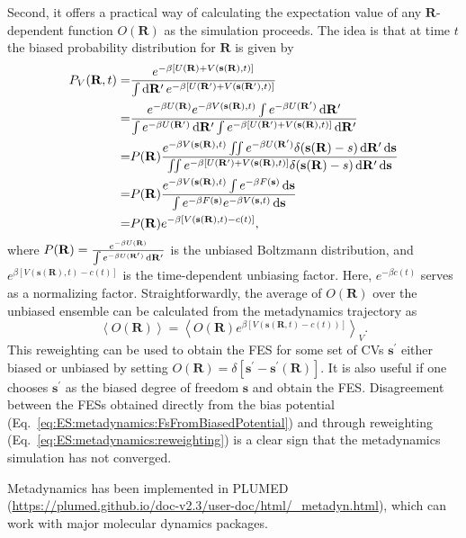 Second, it offers a practical way of calculating the expectation value of any $\mathbf{R}$-dependent function $O(\mathbf{R})$ as the simulation proceeds. The idea is that at time $t$ the biased probability distribution for $\mathbf{R}$ is given by
\begin{align}
    P_V{(\mathbf{R},t)}=&\frac{e^{-\beta\left[U(\mathbf{R})+V(\mathbf{s}(\mathbf{R}),t)\right]}}{\int \diff \mathbf{R}^\prime\, e^{-\beta\left[U(\mathbf{R}^\prime)+V(\mathbf{s}(\mathbf{R}^\prime),t)\right]}}\notag\\
                       =&\frac{e^{-\beta U(\mathbf{R})}e^{-\beta V(\mathbf{s}(\mathbf{R}),t)}\int e^{-\beta U(\mathbf{R^\prime})}\diff \mathbf{R}^\prime}{\int e^{-\beta U(\mathbf{R^\prime})}\diff \mathbf{R}^\prime \int e^{-\beta \left[U(\mathbf{R}^\prime)+V(\mathbf{s}(\mathbf{R}),t)\right]}\diff \mathbf{R}^\prime}\notag\\
                       =&P(\mathbf{R})\frac{e^{-\beta V(\mathbf{s}(\mathbf{R}),t)}\iint e^{-\beta U(\mathbf{R^\prime})}\delta (\mathbf{s}(\mathbf{R})-s)\diff \mathbf{R}^\prime \diff \mathbf{s}}{\iint e^{-\beta \left[U(\mathbf{R}^\prime)+V(\mathbf{s}(\mathbf{R}),t)\right]}\delta (\mathbf{s}(\mathbf{R})-s)\diff \mathbf{R}^\prime \diff \mathbf{s}}\notag\\
                       =&P(\mathbf{R})\frac{e^{-\beta V(\mathbf{s}(\mathbf{R}),t)}\int e^{-\beta F(\mathbf{s})}\diff \mathbf{s}}{\int e^{-\beta F(\mathbf{s})}e^{-\beta V(\mathbf{s},t)}\diff \mathbf{s}}\notag\\
                       =&P{(\mathbf{R})}e^{-\beta\left[V(\mathbf{s}(\mathbf{R}),t)-c(t)\right]},
\end{align}
where $P{(\mathbf{R})}=\frac{e^{-\beta U(\mathbf{R})}}{\int e^{-\beta U(\mathbf{R}^\prime)}\mathop{}\!\mathrm{d} \mathbf{R}^\prime}$ is the unbiased Boltzmann distribution, and $e^{\beta\left[V(\mathbf{s}(\mathbf{R}),t)-c(t)\right]}$ is the time-dependent unbiasing factor. Here, $e^{-\beta c(t)}$ serves as a normalizing factor. Straightforwardly, the average of $O(\mathbf{R})$ over the unbiased ensemble can be calculated from the metadynamics trajectory as
\begin{equation}
    \left<O(\mathbf{R})\right>=\left<O(\mathbf{R})e^{\beta\left[V(\mathbf{s}(\mathbf{R},t)-c(t))\right]}\right>_V.
    \label{eq:ES:metadynamics:reweighting}
\end{equation}
This reweighting can be used to obtain the FES for some set of CVs $\mathbf{s}^\prime$ either biased or unbiased by setting $O(\mathbf{R})=\delta[\mathbf{s}^\prime-\mathbf{s}^\prime(\mathbf{R})]$. It is also useful if one chooses $\mathbf{s}^\prime$ as the biased degree of freedom $\mathbf{s}$ and obtain the FES. Disagreement between the FESs obtained directly from the bias potential (Eq.~\ref{eq:ES:metadynamics:FsFromBiasedPotential}) and through reweighting (Eq.~\ref{eq:ES:metadynamics:reweighting}) is a clear sign that the metadynamics simulation has not converged.

Metadynamics has been implemented in PLUMED (\url{https://plumed.github.io/doc-v2.3/user-doc/html/_metadyn.html}), which can work with major molecular dynamics packages.
